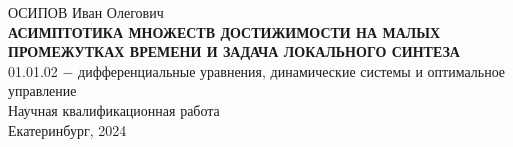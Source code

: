 \documentclass[../main.tex]{subfiles}
\begin{document}
	\begin{titlepage}
	    \begin{center}
        \vspace*{5cm}
		\Large{ОСИПОВ Иван Олегович}\\
		\vspace{2cm}
		\large{\textbf{АСИМПТОТИКА МНОЖЕСТВ ДОСТИЖИМОСТИ НА МАЛЫХ ПРОМЕЖУТКАХ ВРЕМЕНИ И ЗАДАЧА ЛОКАЛЬНОГО СИНТЕЗА}}\\
		\vspace{1cm}
		01.01.02 $-$ дифференциальные уравнения, динамические системы и оптимальное управление\\
		\vspace{1cm}
		\textsf{Научная квалификационная работа}\\
	    \vspace{\fill}
	    \large{Екатеринбург, 2024}
	    \end{center}
	\end{titlepage}
\end{document}
